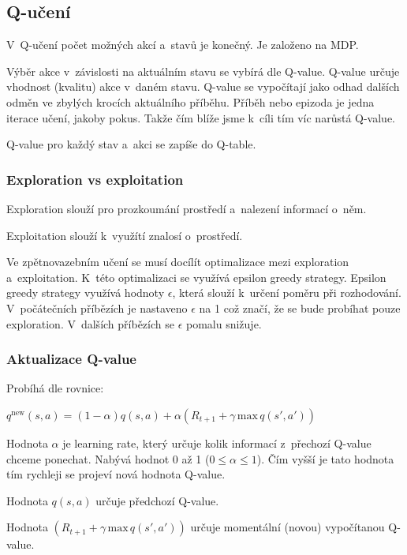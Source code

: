 \subsection{Q-učení}

V~Q-učení počet možných akcí a~stavů je konečný.
Je založeno na MDP.

Výběr akce v~závislosti na aktuálním stavu se vybírá dle Q-value.
Q-value určuje vhodnost (kvalitu) akce v~daném stavu.
Q-value se vypočítají jako odhad dalších odměn ve zbylých krocích aktuálního příběhu.
Příběh nebo epizoda je jedna iterace učení, jakoby pokus.
Takže čím blíže jsme k~cíli tím víc narůstá Q-value.

Q-value pro každý stav a~akci se zapíše do Q-table. 

\subsubsection{Exploration vs exploitation}

Exploration slouží pro prozkoumání prostředí a~nalezení informací o~něm.

Exploitation slouží k~využítí znalosí o~prostředí.

Ve zpětnovazebním učení se musí docílít optimalizace mezi exploration a~exploitation.
K~této optimalizaci se využívá epsilon greedy strategy.
Epsilon greedy strategy využívá hodnoty $\epsilon$, která slouží k~určení poměru při rozhodování.
V~počátečních příbězích je nastaveno $\epsilon$ na 1 což značí, že se bude probíhat pouze exploration. 
V~dalších příbězích se $\epsilon$ pomalu snižuje.

\subsubsection{Aktualizace Q-value}

Probíhá dle rovnice:

$q^\text{new}(s,a) = (1-\alpha)q(s,a) + \alpha \left(R_{t+1} + \gamma\,\text{max}\,q(s',a')\right)$

Hodnota $\alpha$ je learning rate, který určuje kolik informací z~přechozí Q-value chceme ponechat.
Nabývá hodnot 0 až 1 ($0\leq\alpha\leq1$).
Čím vyšší je tato hodnota tím rychleji se projeví nová hodnota Q-value. 

Hodnota $q(s,a)$ určuje předchozí Q-value.

Hodnota $\left(R_{t+1} + \gamma\,\text{max}\,q(s',a')\right)$ určuje momentální (novou) vypočítanou Q-value.

